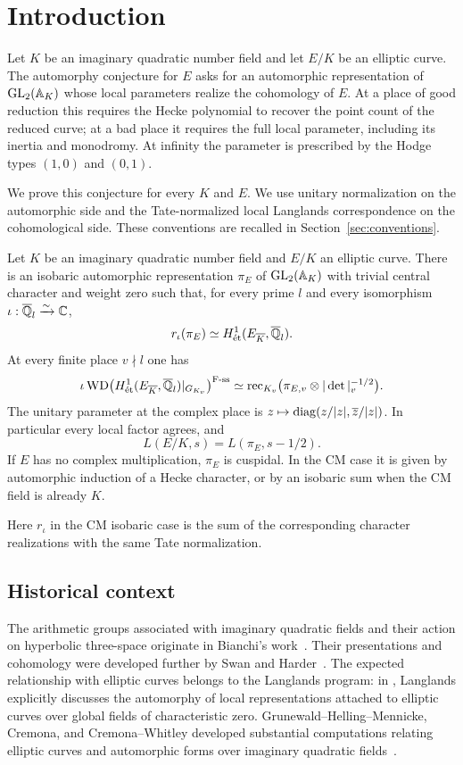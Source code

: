 \section{Introduction}\label{sec:introduction}

Let $K$ be an imaginary quadratic number field and let $E/K$ be an
elliptic curve. The automorphy conjecture for $E$ asks for an automorphic
representation of $\operatorname{GL}_2(\mathbb A_K)$ whose local parameters realize the
cohomology of $E$. At a place of good reduction this requires the Hecke
polynomial to recover the point count of the reduced curve; at a bad
place it requires the full local parameter, including its inertia and
monodromy. At infinity the parameter is prescribed by the Hodge types
$(1,0)$ and $(0,1)$.

We prove this conjecture for every $K$ and $E$. We use unitary
normalization on the automorphic side and the Tate-normalized local
Langlands correspondence on the cohomological side. These conventions
are recalled in Section~\ref{sec:conventions}.

\begin{theorem}\label{thm:main}
Let $K$ be an imaginary quadratic number field and $E/K$ an elliptic
curve. There is an isobaric automorphic representation $\pi_E$ of
$\operatorname{GL}_2(\mathbb A_K)$ with trivial central character and weight zero such that,
for every prime $l$ and every isomorphism
$\iota:\overline{\mathbb Q}_l\xrightarrow{\sim}\mathbb C$,
\[
 r_\iota(\pi_E)\simeq
 H^1_{\mathrm{\acute et}}(E_{\overline K},\overline{\mathbb Q}_l).
\]
At every finite place $v\nmid l$ one has
\[
 \iota\operatorname{WD}\bigl(H^1_{\mathrm{\acute et}}(E_{\overline K},\overline{\mathbb Q}_l)
                     |_{G_{K_v}}\bigr)^{\mathrm{F\text{-}ss}}
 \simeq
 \operatorname{rec}_{K_v}\bigl(\pi_{E,v}\otimes|\det|_v^{-1/2}\bigr).
\]
The unitary parameter at the complex place is
$z\mapsto\operatorname{diag}(z/|z|,\overline z/|z|)$.
In particular every local factor agrees, and
\[
 L(E/K,s)=L(\pi_E,s-1/2).
\]
If $E$ has no complex multiplication, $\pi_E$ is cuspidal. In the CM
case it is given by automorphic induction of a Hecke character, or by
an isobaric sum when the CM field is already $K$.
\end{theorem}

Here $r_\iota$ in the CM isobaric case is the sum of the corresponding
character realizations with the same Tate normalization.

\subsection{Historical context}

The arithmetic groups associated with imaginary quadratic fields and
their action on hyperbolic three-space originate in Bianchi's
work~\cite{Bianchi}. Their presentations and cohomology were developed
further by Swan and Harder~\cite{Swan,Harder}. The expected relationship
with elliptic curves belongs to the Langlands program: in
\cite[Section~7]{LanglandsProblems}, Langlands explicitly discusses the
automorphy of local representations attached to elliptic curves over
global fields of characteristic zero. Grunewald--Helling--Mennicke,
Cremona, and Cremona--Whitley developed substantial computations relating
elliptic curves and automorphic forms over imaginary quadratic
fields~\cite{GHM,Cremona,CremonaWhitley}.

